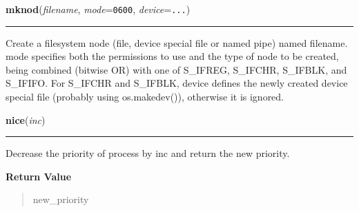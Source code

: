     \label{os:mknod}

    \vspace{0.5ex}

\hspace{.8\funcindent}\begin{boxedminipage}{\funcwidth}

    \raggedright \textbf{mknod}(\textit{filename}, \textit{mode}={\tt 0600}, \textit{device}={\tt ...})

    \vspace{-1.5ex}

    \rule{\textwidth}{0.5\fboxrule}
\setlength{\parskip}{2ex}
    Create a filesystem node (file, device special file or named pipe) 
    named filename. mode specifies both the permissions to use and the type
    of node to be created, being combined (bitwise OR) with one of 
    S\_IFREG, S\_IFCHR, S\_IFBLK, and S\_IFIFO. For S\_IFCHR and S\_IFBLK, 
    device defines the newly created device special file (probably using 
    os.makedev()), otherwise it is ignored.

\setlength{\parskip}{1ex}
    \end{boxedminipage}

    \label{os:nice}

    \vspace{0.5ex}

\hspace{.8\funcindent}\begin{boxedminipage}{\funcwidth}

    \raggedright \textbf{nice}(\textit{inc})

    \vspace{-1.5ex}

    \rule{\textwidth}{0.5\fboxrule}
\setlength{\parskip}{2ex}
    Decrease the priority of process by inc and return the new priority.

\setlength{\parskip}{1ex}
      \textbf{Return Value}
    \vspace{-1ex}

      \begin{quote}
      new\_priority

      \end{quote}

    \end{boxedminipage}

    \label{os:open}

    \vspace{0.5ex}

